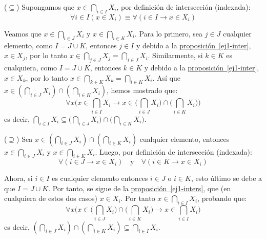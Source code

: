 \documentclass[letterpaper,DIV=14,headsepline,12pt]{scrartcl}
\makeatletter
\newcommand{\customRef}[2]{\hyperref[#1]{#2~\ref*{#1}}}
\renewenvironment{proof}[1][]{%
        \par\pushQED{\qed}%
        \normalfont\topsep6pt \partopsep0pt %
        \trivlist
        \item[\hskip\labelsep
                \textbf{\textit{Demostración.}}%
        ]#1
        }{%
        \popQED\endtrivlist\@endpefalse
    }
\makeatother
\begin{document}
    \begin{proof}
        ($\subseteq$) Supongamos que $x \in \bigcap_{i \in I} X_i$, por definición de intersección (indexada):
        \begin{equation}\label{ej1-inter}
            \forall i \in I (x \in X_i) \equiv \forall ( i \in I \to x \in X_i)
        \end{equation}

        Veamos que $x \in \bigcap_{i \in J} X_i$ y $x \in \bigcap_{i \in K} X_i$. Para lo primero, sea $j \in J$ cualquier elemento, como $I=J \cup K$, entonces $j \in I$ y debido a la \customRef{ej1-inter}{proposición}, $x \in X_j$, por lo tanto $x \in \bigcap_{j \in J} X_j = \bigcap_{i \in J} X_i$. Similarmente, si $k \in K$ es cualquiera, como $I=J \cup K$, entonces $k \in K$ y debido a la \customRef{ej1-inter}{proposición}, $x \in X_k$, por lo tanto $x \in \bigcap_{k \in K} X_k = \bigcap_{i \in K} X_i$. Así que $x \in ( \bigcap_{i \in J} X_i ) \cap ( \bigcap_{i \in K} X_i )$, hemos mostrado que:
        \[ \forall x \bigg( x \in \bigcap_{i \in I} X_i \to x \in \Big( \bigcap_{i \in J} X_i \Big) \cap \Big( \bigcap_{i \in K} X_i \Big) \bigg) \]
        es decir, $\bigcap_{i \in I} X_i \subseteq \Big( \bigcap_{i \in J} X_i \Big) \cap \Big( \bigcap_{i \in K} X_i \Big)$.

        ($\supseteq$) Sea $x \in ( \bigcap_{i \in J} X_i ) \cap ( \bigcap_{i \in K} X_i )$ cualquier elemento, entonces $x \in \bigcap_{i \in J} X_i$ y $x \in \bigcap_{i \in K} X_i$. Luego, por definición de intersección (indexada):
        \begin{equation}\label{ej1-inters}
            \forall ( i \in J \to x \in X_i) \quad \text{y} \quad \forall ( i \in K \to x \in X_i)
        \end{equation}
        
        Ahora, si $i \in I$ es cualquier elemento entonces $i \in J$ o $i \in K$, esto último se debe a que $I=J \cup K$. Por tanto, se sigue de la \customRef{ej1-inters}{proposición}, que (en cualquiera de estos dos casos) $x \in X_i$. Por tanto $x \in \bigcap_{i \in I}  X_i$, probando que:
        \[ \forall x \bigg( x \in \Big( \bigcap_{i \in J} X_i \Big) \cap \Big( \bigcap_{i \in K} X_i \Big) \to x\in \bigcap_{i \in I} X_i \bigg) \]
        es decir, $( \bigcap_{i \in J} X_i ) \cap ( \bigcap_{i \in K} X_i ) \subseteq \bigcap_{i \in I} X_i$.
    \end{proof} \newpage
\end{document}
